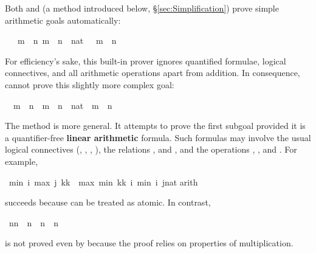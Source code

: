 \begin{isabellebody}
\begin{isamarkuptext}
Both  and 
(a method introduced below, \S\ref{sec:Simplification}) prove 
simple arithmetic goals automatically:%
\end{isamarkuptext}%
\ {\isachardoublequote}{\isasymlbrakk}\ {\isasymnot}\ m\ {\isacharless}\ n{\isacharsemicolon}\ m\ {\isacharless}\ n\ {\isacharplus}\ {\isacharparenleft}{}{\isacharcolon}{\isacharcolon}nat{\isacharparenright}\ {\isasymrbrakk}\ {\isasymLongrightarrow}\ m\ {\isacharequal}\ n{\isachardoublequote}%
\begin{isamarkuptext}%
\noindent
For efficiency's sake, this built-in prover ignores quantified formulae,
logical connectives, and all arithmetic operations apart from addition.
In consequence,  cannot prove this slightly more complex goal:%
\end{isamarkuptext}%
\ {\isachardoublequote}{\isasymnot}\ m\ {\isacharless}\ n\ {\isasymand}\ m\ {\isacharless}\ n\ {\isacharplus}\ {\isacharparenleft}{}{\isacharcolon}{\isacharcolon}nat{\isacharparenright}\ {\isasymLongrightarrow}\ m\ {\isacharequal}\ n{\isachardoublequote}%
\begin{isamarkuptext}%
\noindent
The method  is more general.  It attempts to prove
the first subgoal provided it is a quantifier-free \textbf{linear arithmetic}
formula.  Such formulas may involve the
usual logical connectives (\isa{{\isasymnot}}, \isa{{\isasymand}}, \isa{{\isasymor}},
\isa{{\isasymlongrightarrow}}), the relations \isa{{\isacharequal}}, \isa{{\isasymle}} and \isa{{\isacharless}},
and the operations
\isa{{\isacharplus}}, \isa{{\isacharminus}},  and . 
For example,%
\end{isamarkuptext}%
\ {\isachardoublequote}min\ i\ {\isacharparenleft}max\ j\ {\isacharparenleft}k{\isacharasterisk}k{\isacharparenright}{\isacharparenright}\ {\isacharequal}\ max\ {\isacharparenleft}min\ {\isacharparenleft}k{\isacharasterisk}k{\isacharparenright}\ i{\isacharparenright}\ {\isacharparenleft}min\ i\ {\isacharparenleft}j{\isacharcolon}{\isacharcolon}nat{\isacharparenright}{\isacharparenright}{\isachardoublequote}\isanewline
{}arith{\isacharparenright}%
\begin{isamarkuptext}%
\noindent
succeeds because  can be treated as atomic. In contrast,%
\end{isamarkuptext}%
\ {\isachardoublequote}n{\isacharasterisk}n\ {\isacharequal}\ n\ {\isasymLongrightarrow}\ n{\isacharequal}{}\ {\isasymor}\ n{\isacharequal}{}{\isachardoublequote}%
\begin{isamarkuptext}%
\noindent
is not proved even by  because the proof relies 
on properties of multiplication.


\end{isamarkuptext}
\end{isabellebody}
